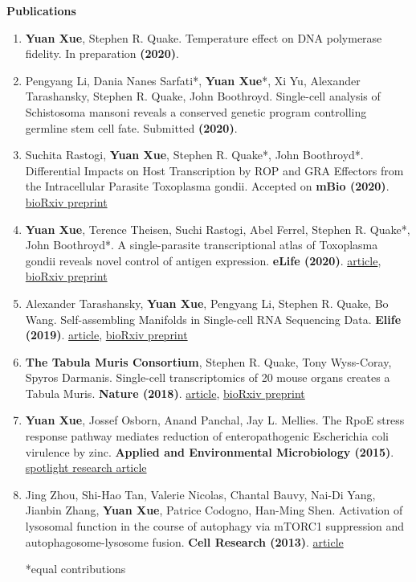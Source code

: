 \documentclass[letterpaper,12pt]{article}[leftmargin=*]
\renewcommand{\section}[2]{\vspace{5pt}
  \colorbox{secondary}{\color{white}\raggedbottom\normalsize\textbf{{#1}{\hspace{7pt}#2}}}
}
\begin{document}
\section{\faBook}{Publications}

\begin{enumerate}
    \item \textbf{Yuan Xue}, Stephen R. Quake. Temperature effect on DNA polymerase fidelity. In preparation \textbf{(2020)}.
    \item Pengyang Li, Dania Nanes Sarfati*, \textbf{Yuan Xue}*, Xi Yu, Alexander Tarashansky, Stephen R. Quake, John Boothroyd. Single-cell analysis of Schistosoma mansoni reveals a conserved genetic program controlling germline stem cell fate. Submitted \textbf{(2020)}.
    \item Suchita Rastogi, \textbf{Yuan Xue}, Stephen R. Quake*, John Boothroyd*. Differential Impacts on Host Transcription by ROP and GRA Effectors from the Intracellular Parasite Toxoplasma gondii. Accepted on \textbf{mBio (2020)}. \href{https://www.biorxiv.org/content/10.1101/2020.02.04.934570v2.abstract}{bioRxiv preprint}
    \item \textbf{Yuan Xue}, Terence Theisen, Suchi Rastogi, Abel Ferrel, Stephen R. Quake*, John Boothroyd*. A single-parasite transcriptional atlas of Toxoplasma gondii reveals novel control of antigen expression. \textbf{eLife (2020)}. \href{https://elifesciences.org/articles/54129}{article}, \href{https://www.biorxiv.org/content/10.1101/656165v2}{bioRxiv preprint}
    \item Alexander Tarashansky, \textbf{Yuan Xue}, Pengyang Li, Stephen R. Quake, Bo Wang. Self-assembling Manifolds in Single-cell RNA Sequencing Data. \textbf{Elife (2019)}. \href{https://elifesciences.org/articles/48994}{article}, \href{https://www.biorxiv.org/content/10.1101/364166v2}{bioRxiv preprint}
    \item \textbf{The Tabula Muris Consortium}, Stephen R. Quake, Tony Wyss-Coray, Spyros Darmanis. Single-cell transcriptomics of 20 mouse organs creates a Tabula Muris. \textbf{Nature (2018)}. \href{https://www.nature.com/articles/s41586-018-0590-4}{article}, \href{https://www.biorxiv.org/content/10.1101/237446v2}{bioRxiv preprint}
    \item \textbf{Yuan Xue}, Jossef Osborn, Anand Panchal, Jay L. Mellies. The RpoE stress response pathway mediates reduction of enteropathogenic Escherichia coli virulence by zinc. \textbf{Applied and Environmental Microbiology (2015)}. \href{https://aem.asm.org/content/81/11/3766.short}{spotlight research article}
    \item  Jing Zhou, Shi-Hao Tan, Valerie Nicolas, Chantal Bauvy, Nai-Di Yang, Jianbin Zhang, \textbf{Yuan Xue}, Patrice Codogno, Han-Ming Shen. Activation of lysosomal function in the course of autophagy via mTORC1 suppression and autophagosome-lysosome fusion. \textbf{Cell Research (2013)}. \href{https://www.ncbi.nlm.nih.gov/pmc/articles/PMC3616426/}{article}

        *equal contributions
\end{enumerate}
\end{document}
